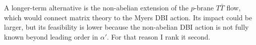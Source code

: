 \documentclass[11pt]{article}
\begin{document}
A longer-term alternative is the non-abelian extension of the $p$-brane $T\bar T$ flow, which would connect matrix theory to the Myers DBI action. Its impact could be larger, but its feasibility is lower because the non-abelian DBI action is not fully known beyond leading order in $\alpha'$. For that reason I rank it second.
\end{document}
